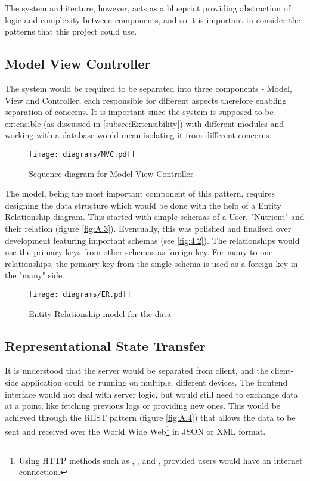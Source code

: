 \documentclass[../main.tex]{subfiles}
\begin{document}
The system architecture, however, acts as a blueprint providing abstraction of logic and complexity between components, and so it is important to consider the patterns that this project could use.

\subsection{Model View Controller}

The system would be required to be separated into three components - Model, View and Controller, each responsible for different aspects therefore enabling separation of concerns. It is important since the system is supposed to be extensible (as discussed in \ref{subsec:Extensibility}) with different modules and working with a database would mean isolating it from different concerns.

\begin{figure}
    \centering
    \texttt{[image: diagrams/MVC.pdf]}
    \caption{Sequence diagram for Model View Controller}%
\end{figure}

The model, being the most important component of this pattern, requires designing the data structure which would be done with the help of a Entity Relationship diagram. This started with simple schemas of a User, "Nutrient" and their relation (figure \ref{fig:A.3}). Eventually, this was polished and finalised over development featuring important schemas (see \ref{fig:4.2}). The relationships would use the primary keys from other schemas as foreign key. For many-to-one relationships, the primary key from the single schema is used as a foreign key in the "many" side.

\begin{figure}
    \centering
    \texttt{[image: diagrams/ER.pdf]}
    \caption{Entity Relationship model for the data}%
\end{figure}

\subsection{Representational State Transfer}

It is understood that the server would be separated from client, and the client-side application could be running on multiple, different devices. The frontend interface would not deal with server logic, but would still need to exchange data at a point, like fetching previous logs or providing new ones. This would be achieved through the REST pattern (figure \ref{fig:A.4}) that allows the data to be sent and received over the World Wide Web\footnote{Using HTTP methods such as , ,  and  \cite{fieldingHypertextTransferProtocol2014}, provided users would have an internet connection.} in JSON or XML format.
\end{document}
